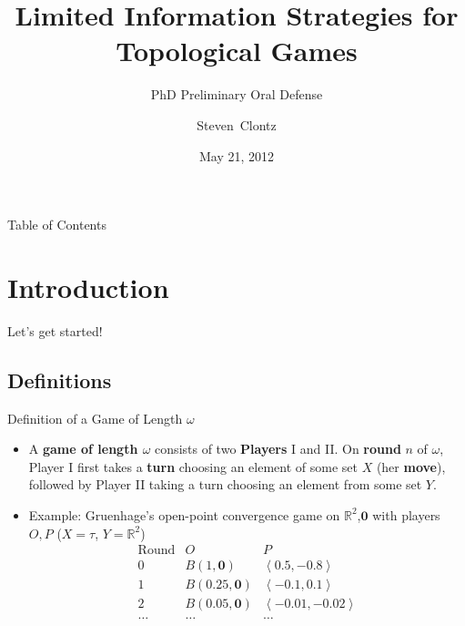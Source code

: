 \documentclass{beamer}
\title[Limited Information Strategies for Topological Games] %
{Limited Information Strategies for Topological Games}
\subtitle
{PhD Preliminary Oral Defense} %
\author%
{Steven~Clontz}%
\institute[Auburn University] %
{
  Department of Mathematics and Statistics\\
  Auburn University}
\date[5-21-2012] %
{May 21, 2012}
\renewcommand{\vec}[1]{\mathbf{#1}}
\begin{document}
\begin{frame}
  \titlepage
\end{frame}

\begin{frame}{Table of Contents}
  \tableofcontents
\end{frame}




\section{Introduction}

\begin{frame}
\centerline{Let's get started!}
\end{frame}

\subsection[Definitions and Notation]{Definitions}

\begin{frame}{Definition of a Game of Length $\omega$}%

\begin{itemize}
\item A \textbf{game of length $\omega$} consists of two \textbf{Players} I and II. On \textbf{round} $n$ of $\omega$, Player I first takes a \textbf{turn} choosing an element of some set $X$ (her \textbf{move}), followed by Player II taking a turn choosing an element from some set $Y$.
\pause
\item Example: Gruenhage's open-point convergence game on $\mathbb{R}^2$,$\vec{0}$ with players $O,P$ ($X=\tau$, $Y=\mathbb{R}^2$)
\[
\begin{array}{r|r|l}
\text{Round} & O & P \\\hline\hline
0 & B(1,\vec{0}) & \left<0.5,-0.8\right> \\\hline
1 & B(0.25,\vec{0}) & \left<-0.1,0.1\right> \\\hline
2 & B(0.05,\vec{0}) & \left<-0.01,-0.02\right> \\\hline
\dots & \dots & \dots
\end{array}
\]
\end{itemize}
\end{frame}
\end{document}

